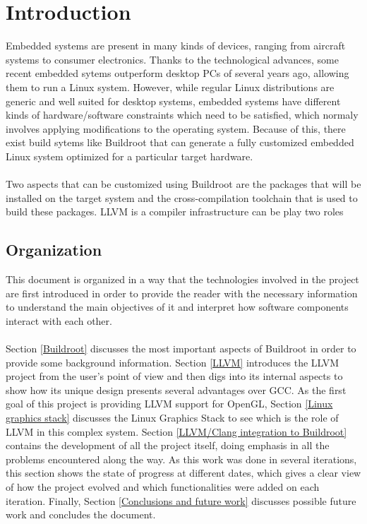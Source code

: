 \documentclass[12pt,a4paper,oneside]{article}
\begin{document}
\section{Introduction}
Embedded systems are present in many kinds of devices, ranging from aircraft
systems to consumer electronics. Thanks to the technological advances, some
recent embedded sytems outperform desktop PCs of several years ago, allowing
them to run a Linux system. However, while regular Linux distributions are
generic and well suited for desktop systems, embedded systems have different
kinds of hardware/software constraints which need to be satisfied, which normaly
involves applying modifications to the operating system. Because of this, there
exist build sytems like Buildroot that can generate a fully customized embedded
Linux system optimized for a particular target hardware.\\\\
Two aspects that can be customized using Buildroot are the packages that will be
installed on the target system and the cross-compilation toolchain that is used
to build these packages. LLVM is a compiler infrastructure can be play two roles

\subsection{Organization}
This document is organized in a way that the technologies involved in the
project are first introduced in order to provide the reader with the necessary
information to understand the main objectives of it and interpret how software
components interact with each other.\\\\
Section \ref{Buildroot} discusses the most
important aspects of Buildroot in order to provide some background information.
Section \ref{LLVM} introduces the LLVM project from the user's point of view and
then digs into its internal aspects to show how its unique design presents
several advantages over GCC. As the first goal of this project is providing
LLVM support for OpenGL, Section \ref{Linux graphics stack} discusses the
Linux Graphics Stack to see which is the role of LLVM in this complex system.
Section \ref{LLVM/Clang integration to Buildroot} contains the development of
all the project itself, doing emphasis in all the problems encountered along
the way. As this work was done in several iterations, this section shows the
state of progress at different dates, which gives a clear view of how the
project evolved and which functionalities were added on each iteration. Finally,
Section \ref{Conclusions and future work} discusses possible future work and
concludes the document.
\end{document}
